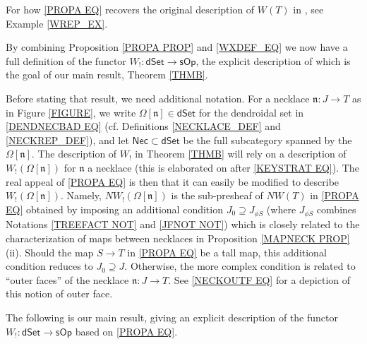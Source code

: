 \documentclass[a4paper,10pt
,draft
]{article}%
\numberwithin{equation}{section}
\numberwithin{figure}{section}
\theoremstyle{definition} %
\newcommand{\sOp}{\ensuremath{\mathsf{sOp}}}%
\newcommand{\dSet}{\mathsf{dSet}}
\newcommand{\1}{\ensuremath{\mathbbm 1}}%
\begin{document}
For how \eqref{PROPA EQ}
recovers the original description of $W(T)$ in \cite[(4.1)]{CM13b},
see Example \ref{WREP_EX}.


\vskip 10pt


	By combining Proposition \ref{PROPA PROP} and \eqref{WXDEF_EQ}
	we now have a full definition of the functor
	$W_! \colon \mathsf{dSet} \to \sOp$,
	the explicit description of which is the goal of our main result, Theorem \ref{THMB}.

	
	Before stating that result, we need additional notation.
	For a necklace $\mathfrak{n}\colon J \to T$ as in Figure \ref{FIGURE},
	we write $\Omega[\mathfrak{n}] \in \dSet$
	for the dendroidal set in \eqref{DENDNECBAD EQ}
	(cf. Definitions \ref{NECKLACE_DEF} 
	and \ref{NECKREP_DEF}),
	and let $\mathsf{Nec} \subset \dSet$
	be the full subcategory spanned by the $\Omega[\mathfrak{n}]$. 
	The description of $W_!$ in Theorem \ref{THMB}
	will rely on a description 
	of $W_!(\Omega[\mathfrak{n}])$
	for $\mathfrak{n}$ a necklace 
	(this is elaborated on after \eqref{KEYSTRAT EQ}).
	The real appeal of \eqref{PROPA EQ}
	is then that it can easily be modified to describe
	$W_!(\Omega[\mathfrak{n}])$.
	Namely,
	$N W_!(\Omega[\mathfrak{n}])$ is the sub-presheaf of 
	$NW(T)$ in \eqref{PROPA EQ}
	obtained by imposing an additional condition
	$J_0 \supseteq J_{\overline{\phi S}}$
	(where $J_{\overline{\phi S}}$ combines
	Notations \ref{TREEFACT NOT} and \ref{JFNOT NOT})
	which is closely related to the characterization of 
	maps between necklaces
	in Proposition \ref{MAPNECK PROP}(ii).
	Should the map $S\to T$ in \eqref{PROPA EQ} be a tall map,
	this additional condition reduces to $J_0 \supseteq J$.
	Otherwise, the more complex condition is related to 
	``outer faces'' of the necklace $\mathfrak{n}\colon J\to T$.
	See \eqref{NECKOUTF EQ} for a depiction of this notion
	of outer face.


The following is our main result, 
giving an explicit description of the
functor $W_!\colon \mathsf{dSet} \to \mathsf{sOp}$
based on \eqref{PROPA EQ}.
\end{document}
